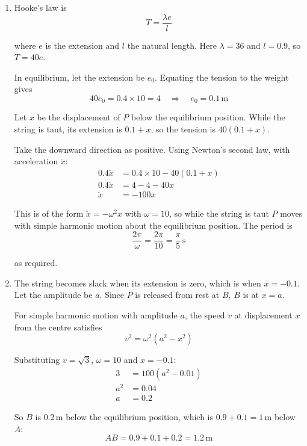 \documentclass[leqno]{article}
\begin{document}
\begin{enumerate}[
  label=\textbf{\arabic*.},
  leftmargin=*,
  topsep=0pt,
  partopsep=0pt,
  parsep=0pt
]
\vspace*{10pt}

\begin{djsSolution}
\begin{enumerate}[label=\textbf{(\alph*)}, start=1]
\item Hooke's law is
\[
T=\frac{\lambda e}{l}
\]

where \(e\) is the extension and \(l\) the natural length. Here \(\lambda=36\) and \(l=0.9\), so \(T=40e\).

In equilibrium, let the extension be \(e_0\). Equating the tension to the weight gives
\[
40e_0=0.4\times 10=4\quad\Longrightarrow\quad e_0=0.1\,\mathrm{m}
\]

Let \(x\) be the displacement of \(P\) below the equilibrium position. While the string is taut, its extension is \(0.1+x\), so the tension is \(40(0.1+x)\).

Take the downward direction as positive. Using Newton's second law, with acceleration \(\ddot{x}\):
\begin{align*}
0.4\ddot{x}&=0.4\times 10-40(0.1+x)\\
0.4\ddot{x}&=4-4-40x\\
\ddot{x}&=-100x
\end{align*}

This is of the form \(\ddot{x}=-\omega^2x\) with \(\omega=10\), so while the string is taut \(P\) moves with simple harmonic motion about the equilibrium position. The period is
\[
\frac{2\pi}{\omega}=\frac{2\pi}{10}=\frac{\pi}{5}\,\mathrm{s}
\]

as required.

\item The string becomes slack when its extension is zero, which is when \(x=-0.1\). Let the amplitude be \(a\). Since \(P\) is released from rest at \(B\), \(B\) is at \(x=a\).

For simple harmonic motion with amplitude \(a\), the speed \(v\) at displacement \(x\) from the centre satisfies
\[
v^2=\omega^2\left(a^2-x^2\right)
\]

Substituting \(v=\sqrt{3}\), \(\omega=10\) and \(x=-0.1\):
\begin{align*}
3&=100\left(a^2-0.01\right)\\
a^2&=0.04\\
a&=0.2
\end{align*}

So \(B\) is \(0.2\,\mathrm{m}\) below the equilibrium position, which is \(0.9+0.1=1\,\mathrm{m}\) below \(A\):
\[
AB=0.9+0.1+0.2=1.2\,\mathrm{m}
\]


\end{enumerate}
\end{djsSolution}
\end{enumerate}
\end{document}
